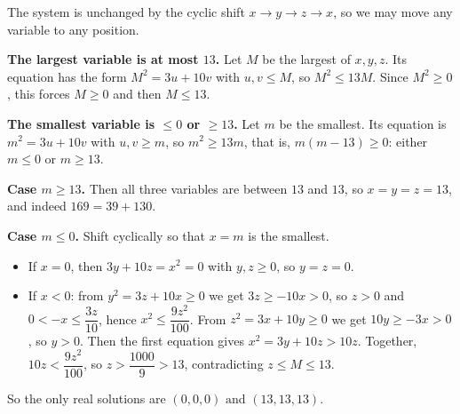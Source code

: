 The system is unchanged by the cyclic shift $x\to y\to z\to x$, so we may move any variable to any position.

\textbf{The largest variable is at most $13$.} Let $M$ be the largest of $x,y,z$. Its equation has the form $M^2=3u+10v$ with $u,v\le M$, so $M^2\le13M$. Since $M^2\ge0$, this forces $M\ge0$ and then $M\le13$.

\textbf{The smallest variable is $\le0$ or $\ge13$.} Let $m$ be the smallest. Its equation is $m^2=3u+10v$ with $u,v\ge m$, so $m^2\ge13m$, that is, $m(m-13)\ge0$: either $m\le0$ or $m\ge13$.

\textbf{Case $m\ge13$.} Then all three variables are between $13$ and $13$, so $x=y=z=13$, and indeed $169=39+130$.

\textbf{Case $m\le0$.} Shift cyclically so that $x=m$ is the smallest.
\begin{itemize}
\item If $x=0$, then $3y+10z=x^2=0$ with $y,z\ge0$, so $y=z=0$.
\item If $x<0$: from $y^2=3z+10x\ge0$ we get $3z\ge-10x>0$, so $z>0$ and $0<-x\le\dfrac{3z}{10}$, hence $x^2\le\dfrac{9z^2}{100}$. From $z^2=3x+10y\ge0$ we get $10y\ge-3x>0$, so $y>0$. Then the first equation gives $x^2=3y+10z>10z$. Together, $10z<\dfrac{9z^2}{100}$, so $z>\dfrac{1000}{9}>13$, contradicting $z\le M\le13$.
\end{itemize}

So the only real solutions are $\boxed{(0,0,0)\text{ and }(13,13,13)}$.
